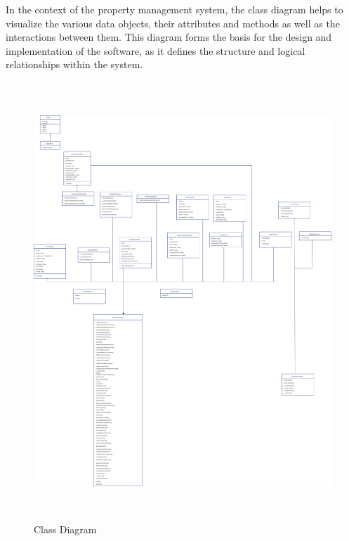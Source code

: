In the context of the property management system, the class diagram helps to visualize the various data objects, their attributes and methods as well as the interactions between them. This diagram forms the basis for the design and implementation of the software, as it defines the structure and logical relationships within the system.
\begin{figure}[h]
\centering
\includegraphics[height=16.50cm]{classdiagram.png}
\caption{Class Diagram}
\label{fig:class-diagram}
\end{figure}